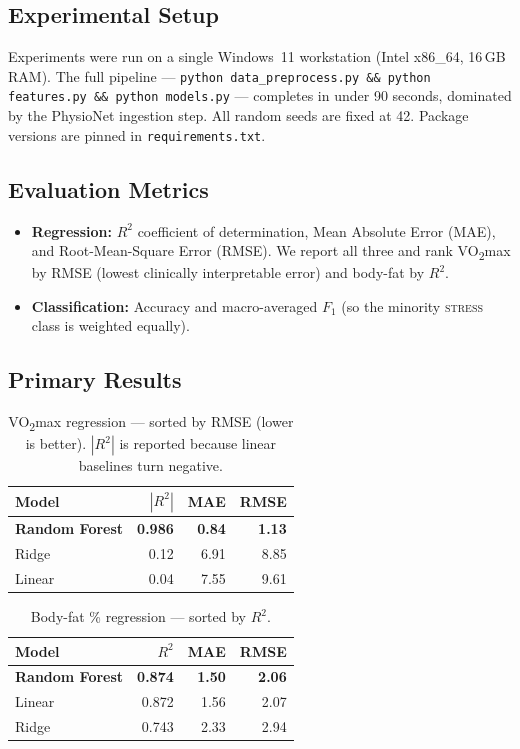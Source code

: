 \documentclass[sigconf,nonacm]{acmart}
\begin{document}
\subsection{Experimental Setup}
Experiments were run on a single Windows~11 workstation (Intel x86\_64,
16\,GB RAM). The full pipeline ---
\texttt{python data\_preprocess.py \&\& python features.py \&\& python models.py}
--- completes in under 90 seconds, dominated by the PhysioNet
ingestion step. All random seeds are fixed at 42. Package versions
are pinned in \texttt{requirements.txt}.

\subsection{Evaluation Metrics}
\begin{itemize}
\item \textbf{Regression:} $R^{2}$ coefficient of determination,
Mean Absolute Error (MAE), and Root-Mean-Square Error (RMSE). We
report all three and rank VO\textsubscript{2}max by RMSE (lowest
clinically interpretable error) and body-fat by $R^{2}$.
\item \textbf{Classification:} Accuracy and macro-averaged $F_{1}$
(so the minority \textsc{stress} class is weighted equally).
\end{itemize}

\subsection{Primary Results}
\label{sec:primary}

\begin{table}[h]
\centering
\caption{VO\textsubscript{2}max regression --- sorted by RMSE (lower is better).
$|R^{2}|$ is reported because linear baselines turn negative.}
\begin{tabular}{@{}lrrr@{}}
\toprule
Model & $|R^{2}|$ & MAE & RMSE \\
\midrule
\textbf{Random Forest} & \textbf{0.986} & \textbf{0.84} & \textbf{1.13} \\
Ridge         & 0.12  & 6.91 & 8.85 \\
Linear        & 0.04  & 7.55 & 9.61 \\
\bottomrule
\end{tabular}
\end{table}

\begin{table}[h]
\centering
\caption{Body-fat \% regression --- sorted by $R^{2}$.}
\begin{tabular}{@{}lrrr@{}}
\toprule
Model & $R^{2}$ & MAE & RMSE \\
\midrule
\textbf{Random Forest} & \textbf{0.874} & \textbf{1.50} & \textbf{2.06} \\
Linear                 & 0.872 & 1.56 & 2.07 \\
Ridge                  & 0.743 & 2.33 & 2.94 \\
\bottomrule
\end{tabular}
\end{table}
\end{document}
